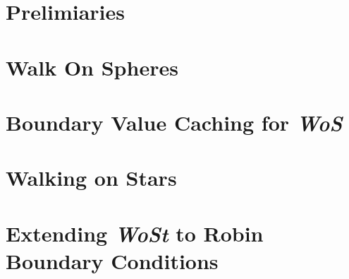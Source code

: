 \documentclass[10pt]{article}
\begin{document}

\section{Prelimiaries}

\section{Walk On Spheres \cite{WalkOnSphere}}

\section{Boundary Value Caching for \emph{WoS} \cite{BVCWoS}}

\section{Walking on Stars \cite{WalkOnStars}}

\section{Extending \emph{WoSt} to Robin Boundary Conditions\cite{WalkinRobin}}

\printbibliography
\end{document}
